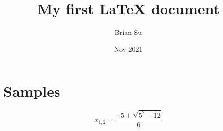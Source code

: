 \documentclass{article}
\title{My first LaTeX document}
\author{Brian Su}
\date{Nov 2021}
\begin{document}
\maketitle

\section{Samples}

$$
x_{1,2} = \frac{-5 \pm \sqrt{5^2-12}}{6}
$$
\end{document}
